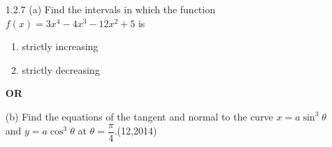\begin{enumerate}[label={},font=\normalfont,leftmargin=1.15cm,labelwidth=1.0cm,labelsep=0.15cm,itemindent=0pt,listparindent=0pt,itemsep=\baselineskip,parsep=0pt,topsep=0pt]
Let $s=x+y+z$ and $\Delta$ be the determinant. Using (\ref{formula-1-1-5}), apply $R_1\to R_1+R_2+R_3$, take out $s$, and then apply $C_2\to C_2-C_1$, $C_3\to C_3-C_1$:
\[
\begin{aligned}
\Delta&=s\begin{vmatrix}1&1&1\\2z&2z&z-x-y\\x-y-z&2x&2x\end{vmatrix}
=s\begin{vmatrix}1&0&0\\2z&0&-s\\x-y-z&s&s\end{vmatrix}\\
&=s\cdot s^2=(x+y+z)^3.
\end{aligned}
\]
The Python code verifies the identity at random points.
\par\noindent\begin{minipage}{\linewidth}
\begin{lstlisting}[frame=single, basicstyle=\rmfamily, escapeinside={(*@}{@*)}]
(*@\makebox[\dimexpr\linewidth-2\fboxsep-2\fboxrule\relax][c]{codes/1.2.6.py}@*)
\end{lstlisting}
\end{minipage}\par

\item[1.2.7]
\noindent(a) Find the intervals in which the function $f(x)=3x^4-4x^3-12x^2+5$ is
\begin{enumerate}[label=(\alph*)]
\setlength{\itemsep}{0pt}
    \item strictly increasing
    \item strictly decreasing
\end{enumerate}\par
\noindent\textbf{OR}\par
\noindent(b) Find the equations of the tangent and normal to the curve $x=a\sin^3\theta$ and $y=a\cos^3\theta$ at $\theta=\dfrac{\pi}{4}$.\nobreak\hfill\mbox{(12,2014)}



\vspace{0.6em}\par\solution


\end{enumerate}
